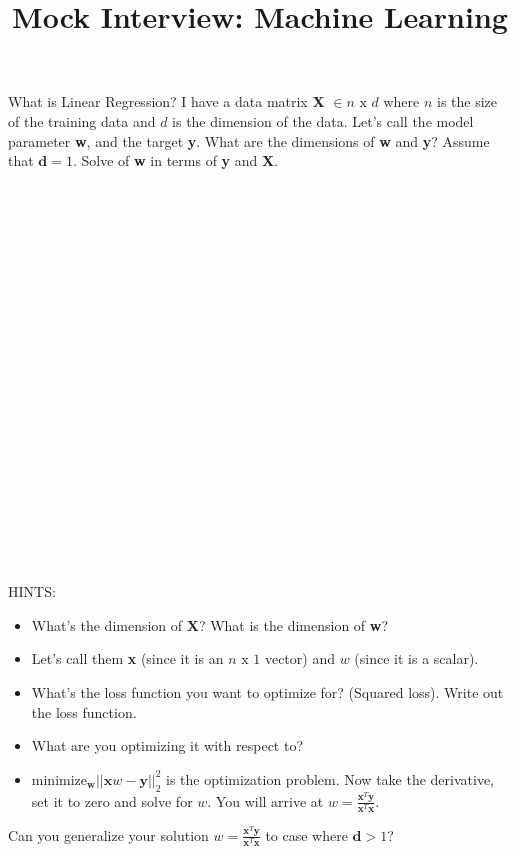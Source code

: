\documentclass{article}
\title{Mock Interview: Machine Learning}
\date{}
\begin{document}
\maketitle

What is Linear Regression?
\newpage
I have a data matrix \textbf{X} $\in n\text{ x }d $ where $n$ is the size of the training data
		and $d$ is the dimension of the data.  Let's call the model parameter \textbf{w}, and the target \textbf{y}.
		What are the dimensions of \textbf{w} and \textbf{y}?
\newpage
Assume that $\textbf{d} = 1$.  Solve of \textbf{w} in terms of \textbf{y} and \textbf{X}.
\\ \\ \\ \\ \\ \\ \\ \\ \\ \\ \\
\\ \\ \\ \\ \\ \\ \\ \\ \\ \\ \\
\vspace{3cm} 
HINTS: 
\begin{itemize}
		\item What's the dimension of \textbf{X}?  What is the dimension of \textbf{w}?
		\item Let's call them \textbf{x} (since it is an $n \text{ x } 1$ vector) and $w$ (since it is a scalar).
		\item What's the loss function you want to optimize for?  (Squared loss).  Write out the loss function.
		\item What are you optimizing it with respect to?

		\item $\text{minimize}_\textbf{w} ||\textbf{x}w - \textbf{y}||_2^2$ is the optimization problem.  Now take the derivative, set it to zero and solve for $w$.  You will arrive at $w = \frac{\textbf{x}^T\textbf{y}}{\textbf{x}^T\textbf{x}}$.
\end{itemize}
				\newpage
Can you generalize your solution $w = \frac{\textbf{x}^T\textbf{y}}{\textbf{x}^T\textbf{x}}$ to case where $\textbf{d} > 1$?  
\end{document}
